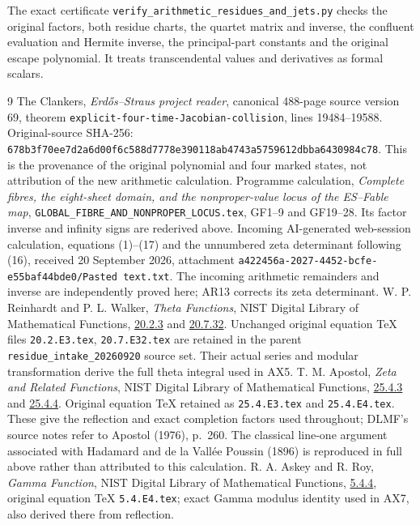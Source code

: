 \documentclass[11pt]{article}
\begin{document}
The exact certificate
\texttt{verify\_arithmetic\_residues\_and\_jets.py}
checks the original factors, both residue charts, the quartet
matrix and inverse, the confluent evaluation and Hermite inverse,
the principal-part constants and the original escape polynomial.
It treats transcendental values and derivatives as formal scalars.

\begin{thebibliography}{9}
 The Clankers, \emph{Erd\H{o}s--Straus project reader},
canonical 488-page source version 69, theorem
\texttt{explicit-four-time-Jacobian-collision}, lines 19484--19588.
Original-source SHA-256:
\texttt{678b3f70ee7d2a6d00f6c588d7778e390118ab4743a5759612dbba6430984c78}.
This is the provenance of the original polynomial and four
marked states, not attribution of the new arithmetic calculation.
 Programme calculation,
\emph{Complete fibres, the eight-sheet domain, and the nonproper-value
locus of the ES--Fable map},
\texttt{GLOBAL\_FIBRE\_AND\_NONPROPER\_LOCUS.tex}, GF1--9 and GF19--28.
Its factor inverse and infinity signs are rederived above.
 Incoming AI-generated web-session calculation,
equations (1)--(17) and the unnumbered zeta determinant following
(16), received 20 September 2026, attachment
\texttt{a422456a-2027-4452-bcfe-e55baf44bde0/Pasted text.txt}.
The incoming arithmetic remainders and inverse are independently
proved here; AR13 corrects its zeta determinant.
 W. P. Reinhardt and P. L. Walker,
\emph{Theta Functions}, NIST Digital Library of Mathematical Functions,
\href{https://dlmf.nist.gov/20.2.E3}{20.2.3} and
\href{https://dlmf.nist.gov/20.7.E32}{20.7.32}.
Unchanged original equation TeX files
\texttt{20.2.E3.tex}, \texttt{20.7.E32.tex}
are retained in the parent \texttt{residue\_intake\_20260920} source set.
Their actual series and modular transformation derive the full
theta integral used in AX5.
 T. M. Apostol,
\emph{Zeta and Related Functions}, NIST Digital Library of
Mathematical Functions,
\href{https://dlmf.nist.gov/25.4.E3}{25.4.3} and
\href{https://dlmf.nist.gov/25.4.E4}{25.4.4}.
Original equation TeX retained as \texttt{25.4.E3.tex} and
\texttt{25.4.E4.tex}. These give the reflection and exact
completion factors used throughout; DLMF's source notes refer
to Apostol (1976), p.~260. The classical line-one argument
associated with Hadamard and de la Vallée Poussin (1896) is
reproduced in full above rather than attributed to this calculation.
 R. A. Askey and R. Roy,
\emph{Gamma Function}, NIST Digital Library of Mathematical Functions,
\href{https://dlmf.nist.gov/5.4.E4}{5.4.4},
original equation TeX \texttt{5.4.E4.tex}; exact Gamma modulus
identity used in AX7, also derived there from reflection.
\end{thebibliography}
\end{document}
